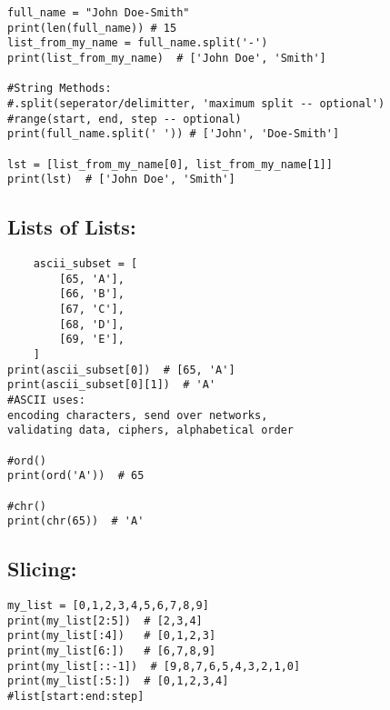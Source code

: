 \documentclass[11pt]{article}
\begin{document}
\begin{verbatim}
full_name = "John Doe-Smith"
print(len(full_name)) # 15
list_from_my_name = full_name.split('-') 
print(list_from_my_name)  # ['John Doe', 'Smith']

#String Methods:
#.split(seperator/delimitter, 'maximum split -- optional')
#range(start, end, step -- optional)
print(full_name.split(' ')) # ['John', 'Doe-Smith']

lst = [list_from_my_name[0], list_from_my_name[1]]
print(lst)  # ['John Doe', 'Smith']
\end{verbatim}

\subsection*{Lists of Lists:}
\begin{verbatim}
    ascii_subset = [
        [65, 'A'],
        [66, 'B'],
        [67, 'C'],
        [68, 'D'],
        [69, 'E'],
    ]
print(ascii_subset[0])  # [65, 'A']
print(ascii_subset[0][1])  # 'A'
#ASCII uses:
encoding characters, send over networks, 
validating data, ciphers, alphabetical order

#ord()
print(ord('A'))  # 65

#chr()
print(chr(65))  # 'A'
\end{verbatim}

\subsection*{Slicing:}
\begin{verbatim}
my_list = [0,1,2,3,4,5,6,7,8,9]
print(my_list[2:5])  # [2,3,4]
print(my_list[:4])   # [0,1,2,3]
print(my_list[6:])   # [6,7,8,9]
print(my_list[::-1])  # [9,8,7,6,5,4,3,2,1,0]
print(my_list[:5:])  # [0,1,2,3,4]
#list[start:end:step]
\end{verbatim}
\end{document}
